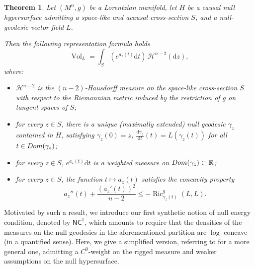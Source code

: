 \documentclass[12pt,a4paper]{amsart}
\theoremstyle{plain}
\newtheorem{theorem}[lemma]{Theorem}
\theoremstyle{definition}
\numberwithin{equation}{section}
\newcommand{\R}{\mathbb{R}}
\DeclareMathOperator{\Ric}{Ric}
\DeclareMathOperator{\vol}{Vol}
\newcommand{\de}{{\mathrm{d}}}
\newcommand{\NC}{\mathsf{NC}}
\begin{document}
\begin{theorem}\label{T:summaryIntro}
  Let $(M^{n},g)$ be a Lorentzian manifold, let $H$ be a causal null hypersurface admitting a space-like and acausal cross-section $S$, and a null-geodesic vector field $L$.

Then the following representation formula holds
%
$$
\vol_L =  \int_{S} \left( e^{a_z(t)} \de t \right) \, \mathcal{H}^{n-2}(\de z),
$$
where:
\begin{itemize}
\item $\mathcal{H}^{n-2}$ is the $(n-2)$-Hausdorff measure on the  space-like cross-section $S$ with respect to the Riemannian metric induced by the restriction of $g$ on tangent spaces of $S$;
\item for every $z\in S$, there is a unique (maximally extended) null geodesic $\gamma_z$ contained in $H$, satisfying $\gamma_z(0)=z$, $\frac{\de \gamma_z}{\de t}(t)=L(\gamma_z(t))$ for all $t\in {\rm Dom}(\gamma_z)$;
\item for every $z\in S$,  $e^{a_z(t)} \de t$ is a weighted measure on ${\rm Dom}(\gamma_z)\subset \R$;
\item for every $z\in S$, the function $t\mapsto a_z(t)$ satisfies the concavity property 
$$ 
    a_z''(t)
    +\frac{(a_z'(t))^2}{n-2}
    \leq
    -\Ric^{g}_{\gamma_z(t)}(L,L)
    .
$$
\end{itemize}
\end{theorem}

Motivated by such a result, we introduce our first synthetic notion of null energy condition, denoted by $\NC^1$, which amounts to require that the densities of the measures on the null geodesics in the aforementioned partition are $\log$-concave (in a quantified sense). Here, we give a simplified version, referring to  for a more general one, admitting a $C^0$-weight on the rigged measure and weaker assumptions on the null hypersurface.
\end{document}

